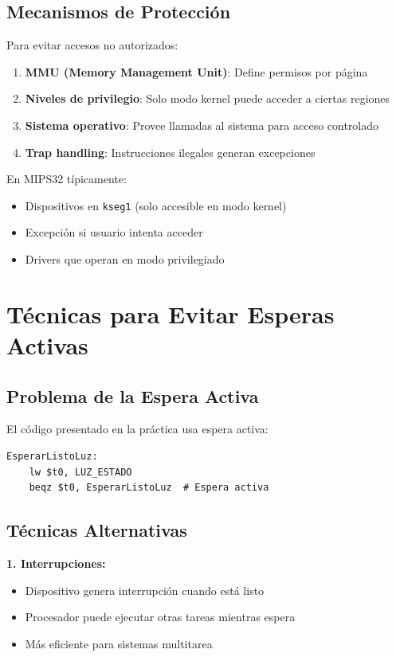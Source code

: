 \documentclass[12pt,a4paper]{article}
\begin{document}
\subsection{Mecanismos de Protección}
Para evitar accesos no autorizados:

\begin{enumerate}
    \item \textbf{MMU (Memory Management Unit)}: Define permisos por página
    \item \textbf{Niveles de privilegio}: Solo modo kernel puede acceder a ciertas regiones
    \item \textbf{Sistema operativo}: Provee llamadas al sistema para acceso controlado
    \item \textbf{Trap handling}: Instrucciones ilegales generan excepciones
\end{enumerate}

En MIPS32 típicamente:
\begin{itemize}
    \item Dispositivos en \texttt{kseg1} (solo accesible en modo kernel)
    \item Excepción si usuario intenta acceder
    \item Drivers que operan en modo privilegiado
\end{itemize}

\section{Técnicas para Evitar Esperas Activas}

\subsection{Problema de la Espera Activa}
El código presentado en la práctica usa espera activa:
\begin{lstlisting}[style=mipsstyle]
EsperarListoLuz:
    lw $t0, LUZ_ESTADO
    beqz $t0, EsperarListoLuz  # Espera activa
\end{lstlisting}

\subsection{Técnicas Alternativas}

\textbf{1. Interrupciones:}
\begin{itemize}
    \item Dispositivo genera interrupción cuando está listo
    \item Procesador puede ejecutar otras tareas mientras espera
    \item Más eficiente para sistemas multitarea
\end{itemize}
\end{document}
